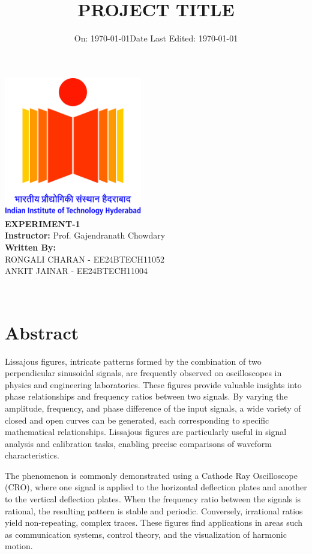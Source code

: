\documentclass[12pt,a4paper]{report}
\title{\LARGE \textbf{PROJECT TITLE}}
\author{}
\date{\large On: \today}
\begin{document}
\makeatletter
\begin{titlepage}
    \centering
    \vspace*{1cm}
       { \includegraphics[width=6cm]{figs/logo.jpg}}\\[1cm]

    {\LARGE \textbf{EXPERIMENT-1}}\\[1cm]
    
    
    
    \textbf{Instructor: }{Prof. Gajendranath Chowdary}\\[1cm]
    
    \textbf{Written By:}\\{RONGALI CHARAN - EE24BTECH11052\\ ANKIT JAINAR - EE24BTECH11004}\\[1cm]
    \date{\large Date Last Edited: \today}
    {\@date\\}
\end{titlepage}
\makeatother

\chapter*{Abstract}
Lissajous figures, intricate patterns formed by the combination of two perpendicular sinusoidal signals, are frequently observed on oscilloscopes in physics and engineering laboratories. These figures provide valuable insights into phase relationships and frequency ratios between two signals. By varying the amplitude, frequency, and phase difference of the input signals, a wide variety of closed and open curves can be generated, each corresponding to specific mathematical relationships. Lissajous figures are particularly useful in signal analysis and calibration tasks, enabling precise comparisons of waveform characteristics.

The phenomenon is commonly demonstrated using a Cathode Ray Oscilloscope (CRO), where one signal is applied to the horizontal deflection plates and another to the vertical deflection plates. When the frequency ratio between the signals is rational, the resulting pattern is stable and periodic. Conversely, irrational ratios yield non-repeating, complex traces. These figures find applications in areas such as communication systems, control theory, and the visualization of harmonic motion.
\end{document}
